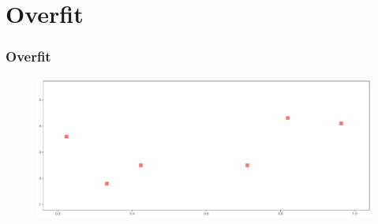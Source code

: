 \documentclass[
  shownotes,
  xcolor={svgnames},
  hyperref={colorlinks,citecolor=DarkBlue,linkcolor=DarkRed,urlcolor=DarkBlue}
  , aspectratio=169]{beamer}
\begin{document}
\section{Overfit}
\begin{frame}[fragile]
\frametitle{Overfit}


        \begin{figure}[H] \centering
            \captionsetup{justification=centering}
              \includegraphics[scale=0.4]{figures/fig_1a.pdf}
 \end{figure}

\end{frame}
\end{document}
